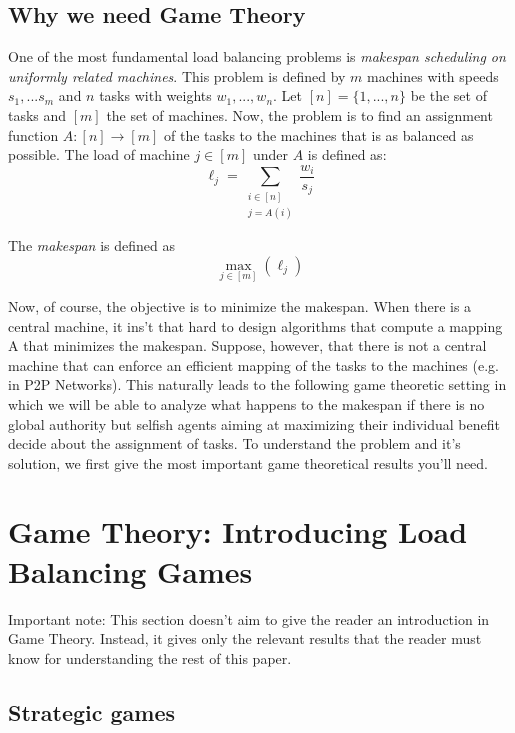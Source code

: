 \documentclass[a4paper,11pt]{article}
\begin{document}
\subsection{Why we need Game Theory}
 One of the most fundamental load balancing problems is \emph{makespan scheduling on uniformly related machines}. This problem is defined by $m$ machines with speeds $s_1,...s_m$ and $n$ tasks with weights $w_1,...,w_n$. Let $[n] = \{1,...,n\}$ be the set of tasks and $[m]$ the set of machines. Now, the problem is to find an assignment function $A: [n] \rightarrow [m]$ of the tasks to the machines that is as balanced as possible. The load of machine $j \in [m]$ under $A$ is defined as:
\begin{displaymath}
  \ell_j = \displaystyle\sum_{\substack{i \in [n] \\j = A(i)}}{\frac{w_i}{s_j}}
\end{displaymath}

The \emph{makespan} is defined as $$\max\limits_{j \in [m]}(\ell_j)$$

Now, of course, the objective is to minimize the makespan. When there is a central machine, it ins't that hard to design algorithms that compute a mapping A that minimizes the makespan. Suppose, however, that there is not a central machine that can enforce an efficient mapping of the tasks to the machines (e.g. in P2P Networks). This naturally leads to the following game theoretic setting in which we will be able to analyze what happens to the makespan if there is no global authority but selfish agents aiming at maximizing their individual benefit decide about the assignment of tasks. To understand the problem and it's solution, we first give the most important game theoretical results you'll need.

\section{Game Theory: Introducing Load Balancing Games}
Important note: This section doesn't aim to give the reader an introduction in Game Theory. Instead, it gives only the relevant results that the reader must know for understanding the rest of this paper.

\subsection{Strategic games}
\end{document}
